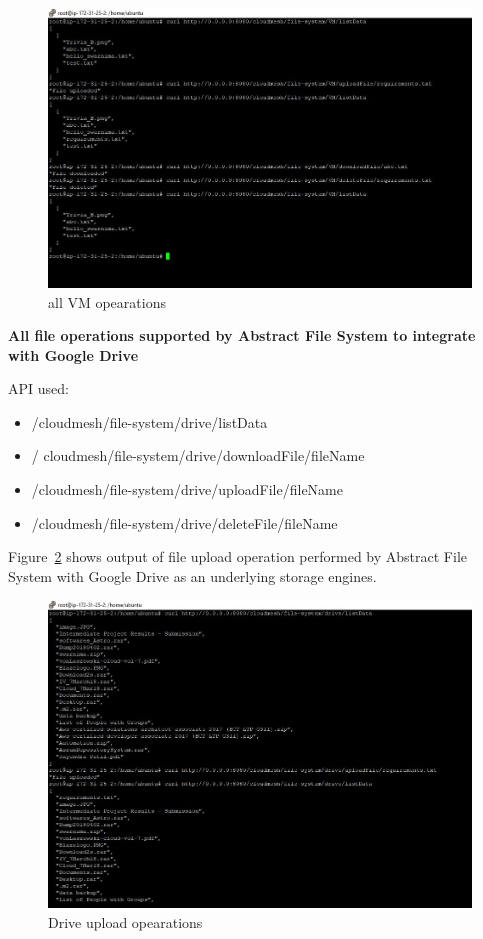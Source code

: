 \begin{figure}[!ht]
        \centering\includegraphics[width=\columnwidth]
        {image/VM.JPG}
        \caption{all VM opearations}\label{fig:VM}
\end{figure}


\textbf{All file operations supported by Abstract File System 
to integrate with Google Drive}


API used:
\begin{itemize}

    \item /cloudmesh/file-system/drive/listData
    \item / cloudmesh/file-system/drive/downloadFile/{fileName}
    \item /cloudmesh/file-system/drive/uploadFile/{fileName}
    \item /cloudmesh/file-system/drive/deleteFile/{fileName}

\end{itemize}

Figure~\ref{fig:drive-upload} shows output of file upload operation performed 
by Abstract File System with Google Drive as an underlying storage engines. 

\begin{figure}[!ht]
        \centering\includegraphics[width=\columnwidth]
        {image/drive-upload.JPG}
        \caption{Drive upload opearations}\label{fig:drive-upload}
\end{figure}


